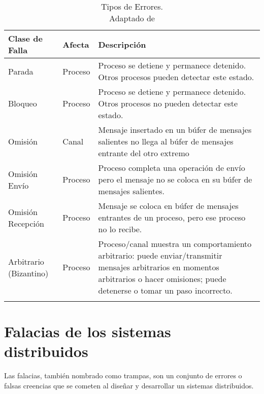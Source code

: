 \begin{table}[h]
	\footnotesize%
	\begin{center}
		\footnotesize
		 \begin{tabular}{p{}p{}p{}}
			\toprule
			Clase de Falla    &  Afecta   & Descripción  \\
			\midrule
			\quad Parada & Proceso & Proceso se detiene y permanece detenido.  Otros procesos pueden detectar este estado. \\
			
			\addlinespace
			\quad 	Bloqueo & Proceso & Proceso se detiene y permanece detenido.  Otros procesos no pueden  detectar este   estado.\\			\addlinespace
			
			\quad Omisión & Canal & Mensaje insertado en un búfer de mensajes  salientes no llega al  b\'ufer de mensajes   entrante del otro extremo  \\
			
			\addlinespace			
			\quad Omisión  Env\'io   & 	Proceso   & Proceso completa una operación de  envío pero el mensaje no se coloca     en su búfer de mensajes salientes.  \\
			
			\addlinespace		
			\quad Omisión  Recepci\'on & Proceso &  Mensaje se coloca en búfer  de mensajes   entrantes de un proceso, pero ese   proceso no lo recibe.  \\
			
			\addlinespace		
			\quad Arbitrario   (Bizantino) &  Proceso   & Proceso/canal muestra un comportamiento  arbitrario:  puede enviar/transmitir  mensajes arbitrarios en momentos arbitrarios o hacer omisiones; puede   detenerse  o tomar un  paso incorrecto. \\
			
			\addlinespace 
			\bottomrule
		\end{tabular}
	\end{center}
	\caption{Tipos de Errores. \\ Adaptado de \cite{Coulouris2011} }
	\label{tab:cat-middle}
\end{table}

\section{Falacias de los sistemas distribuidos}

Las falacias, también nombrado como trampas, son un conjunto de errores o falsas creencias que se cometen al diseñar y desarrollar un  sistemas distribuidos. 


